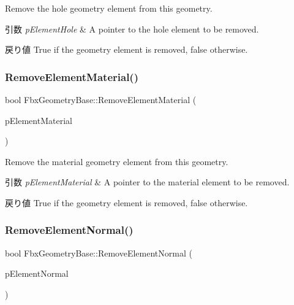 Remove the hole geometry element from this geometry. 
\begin{DoxyParams}{引数}
{\em p\+Element\+Hole} & A pointer to the hole element to be removed. \\
\hline
\end{DoxyParams}
\begin{DoxyReturn}{戻り値}
{\ttfamily True} if the geometry element is removed, {\ttfamily false} otherwise. 
\end{DoxyReturn}
\mbox{\label{class_fbx_geometry_base_a396c0e3be695dbca3724be1e47e9f7cb}} 
\subsubsection{\texorpdfstring{Remove\+Element\+Material()}{RemoveElementMaterial()}}
{\footnotesize\ttfamily bool Fbx\+Geometry\+Base\+::\+Remove\+Element\+Material (\begin{DoxyParamCaption}\item[{\hyperlink{fbxlayer_8h_a1a779f3f614dbf0024c07f4a1d8332f4}{Fbx\+Geometry\+Element\+Material} $\ast$}]{p\+Element\+Material }\end{DoxyParamCaption})}

Remove the material geometry element from this geometry. 
\begin{DoxyParams}{引数}
{\em p\+Element\+Material} & A pointer to the material element to be removed. \\
\hline
\end{DoxyParams}
\begin{DoxyReturn}{戻り値}
{\ttfamily True} if the geometry element is removed, {\ttfamily false} otherwise. 
\end{DoxyReturn}
\mbox{\label{class_fbx_geometry_base_a9aadbaa3f50db80b67bd1b3bc9119c7b}} 
\subsubsection{\texorpdfstring{Remove\+Element\+Normal()}{RemoveElementNormal()}}
{\footnotesize\ttfamily bool Fbx\+Geometry\+Base\+::\+Remove\+Element\+Normal (\begin{DoxyParamCaption}\item[{\hyperlink{fbxlayer_8h_a54a5aaec6f1979871fe9d93dd2d246c9}{Fbx\+Geometry\+Element\+Normal} $\ast$}]{p\+Element\+Normal }\end{DoxyParamCaption})}

